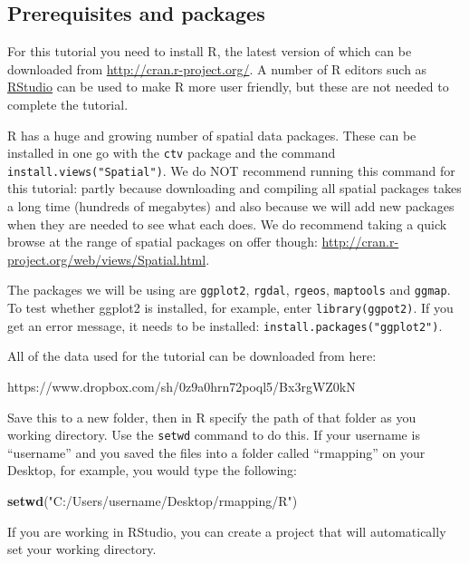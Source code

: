 \documentclass[]{article}
\newenvironment{Shaded}{}{}
\newcommand{\KeywordTok}[1]{\textcolor[rgb]{0.00,0.44,0.13}{\textbf{{#1}}}}
\newcommand{\StringTok}[1]{\textcolor[rgb]{0.25,0.44,0.63}{{#1}}}
\newcommand{\NormalTok}[1]{{#1}}
\begin{document}
\subsection{Prerequisites and packages}

For this tutorial you need to install R, the latest version of which can
be downloaded from
\href{http://cran.r-project.org/}{http://cran.r-project.org/}. A number
of R editors such as \href{http://www.rstudio.com/}{RStudio} can be used
to make R more user friendly, but these are not needed to complete the
tutorial.

R has a huge and growing number of spatial data packages. These can be
installed in one go with the \texttt{ctv} package and the command
\texttt{install.views("Spatial")}. We do NOT recommend running this
command for this tutorial: partly because downloading and compiling all
spatial packages takes a long time (hundreds of megabytes) and also
because we will add new packages when they are needed to see what each
does. We do recommend taking a quick browse at the range of spatial
packages on offer though:
\href{http://cran.r-project.org/web/views/Spatial.html}{http://cran.r-project.org/web/views/Spatial.html}.

The packages we will be using are \texttt{ggplot2}, \texttt{rgdal},
\texttt{rgeos}, \texttt{maptools} and \texttt{ggmap}. To test whether
ggplot2 is installed, for example, enter \texttt{library(ggpot2)}. If
you get an error message, it needs to be installed:
\texttt{install.packages("ggplot2")}.

All of the data used for the tutorial can be downloaded from here:

https://www.dropbox.com/sh/0z9a0hrn72poql5/Bx3rgWZ0kN

Save this to a new folder, then in R specify the path of that folder as
you working directory. Use the \texttt{setwd} command to do this. If
your username is ``username'' and you saved the files into a folder
called ``rmapping'' on your Desktop, for example, you would type the
following:

\begin{Shaded}
\begin{Highlighting}[]
\KeywordTok{setwd}\NormalTok{(}\StringTok{"C:/Users/username/Desktop/rmapping/R"}\NormalTok{)}
\end{Highlighting}
\end{Shaded}
If you are working in RStudio, you can create a project that will
automatically set your working directory.
\end{document}
